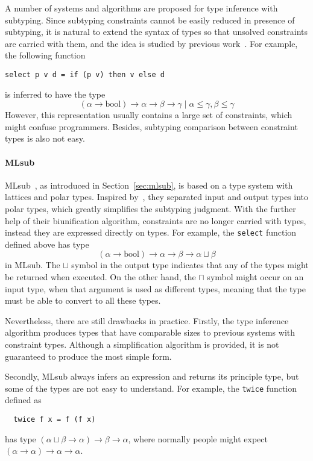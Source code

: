 A number of systems and algorithms are proposed for type inference with subtyping.
Since subtyping constraints cannot be easily reduced in presence of subtyping,
it is natural to extend the syntax of types so that unsolved constraints are carried with them,
and the idea is studied by previous work~\citep{RecConstraint1995, subcon1996}.
For example, the following function
\begin{verbatim}
select p v d = if (p v) then v else d
\end{verbatim}
is inferred to have the type
$$(\alpha \to \text{bool}) \to \alpha \to \beta \to \gamma \mid \alpha \le \gamma, \beta \le \gamma$$
However, this representation usually contains a large set of constraints,
which might confuse programmers.
Besides, subtyping comparison between constraint types is also not easy.

\paragraph{MLsub}
MLsub~\citep{mlsub}, as introduced in Section~\ref{sec:mlsub},
is based on a type system with lattices and polar types.
Inspired by~\citep{pottier1998phd}, they separated input and output types into polar types,
which greatly simplifies the subtyping judgment.
With the further help of their biunification algorithm,
constraints are no longer carried with types,
instead they are expressed directly on types.
For example, the \verb|select| function defined above has type
$$(\alpha \to \text{bool}) \to \alpha \to \beta \to \alpha \sqcup \beta$$
in MLsub.
The $\sqcup$ symbol in the output type indicates that
any of the types might be returned when executed.
On the other hand, the $\sqcap$ symbol might occur on an input type,
when that argument is used as different types,
meaning that the type must be able to convert to all these types.

Nevertheless, there are still drawbacks in practice.
Firstly, the type inference algorithm produces types that
have comparable sizes to
previous systems with constraint types.
Although a simplification algorithm is provided,
it is not guaranteed to produce the most simple form.

Secondly, MLsub always infers an expression and returns its principle type,
but some of the types are not easy to understand.
For example, the \verb|twice| function defined as
\begin{verbatim}
  twice f x = f (f x)
\end{verbatim}
has type $(\alpha \sqcup \beta \to \alpha) \to \beta \to \alpha$,
where normally people might expect $(\alpha \to \alpha) \to \alpha \to \alpha$.

